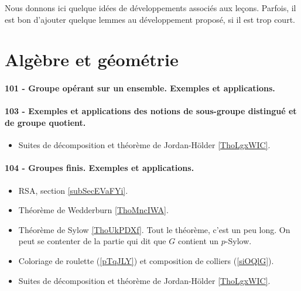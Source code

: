 

Nous donnons ici quelque idées de développements associés aux leçons. Parfois, il est bon d'ajouter quelque lemmes au développement proposé, si il est trop court.

\section{Algèbre et géométrie}


\paragraph{101 - Groupe opérant sur un ensemble. Exemples et applications.}
\paragraph{103 - Exemples et applications des notions de sous-groupe distingué et de groupe quotient.}
\begin{itemize}
    \item Suites de décomposition et théorème de Jordan-Hölder \ref{ThoLgxWIC}.
\end{itemize}

\paragraph{104 - Groupes finis. Exemples et applications.}
\begin{itemize}
    \item RSA, section \ref{subSecEVaFYi}.
    \item Théorème de Wedderburn \ref{ThoMncIWA}.
    \item Théorème de Sylow \ref{ThoUkPDXf}. Tout le théorème, c'est un peu long. On peut se contenter de la partie qui dit que \( G\) contient un \( p\)-Sylow.
    \item Coloriage de roulette (\ref{pTqJLY}) et composition de colliers (\ref{siOQlG}).
    \item Suites de décomposition et théorème de Jordan-Hölder \ref{ThoLgxWIC}.
\end{itemize}


